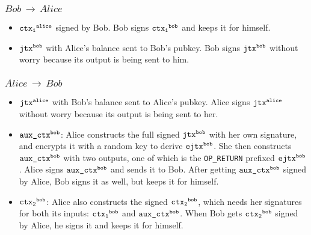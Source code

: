 \subsubsection{$Bob\,\to\,Alice$}
\begin{itemize}[leftmargin=4\parindent]
    \item $\texttt{ctx\textsubscript{1}\textsuperscript{alice}}$ signed by Bob. Bob signs $\texttt{ctx\textsubscript{1}\textsuperscript{bob}}$ and keeps it for himself.
    \item $\texttt{jtx\textsuperscript{bob}}$ with Alice's balance sent to Bob's pubkey. Bob signs $\texttt{jtx\textsuperscript{bob}}$ without worry because its output is being sent to him.
\end{itemize}
\subsubsection{$Alice\,\to\,Bob$}
\begin{itemize}[leftmargin=4\parindent]
    \item $\texttt{jtx\textsuperscript{alice}}$ with Bob's balance sent to Alice's pubkey. Alice signs $\texttt{jtx\textsuperscript{alice}}$ without worry because its output is being sent to her.
    \item $\texttt{aux\_ctx\textsuperscript{bob}}$: Alice constructs the full signed $\texttt{jtx\textsuperscript{bob}}$ with her own signature, and encrypts it with a random key to derive $\texttt{ejtx\textsuperscript{bob}}$. She then constructs $\texttt{aux\_ctx\textsuperscript{bob}}$ with two outputs, one of which is the \texttt{OP\_RETURN} prefixed $\texttt{ejtx\textsuperscript{bob}}$. Alice signs $\texttt{aux\_ctx\textsuperscript{bob}}$ and sends it to Bob. After getting $\texttt{aux\_ctx\textsuperscript{bob}}$ signed by Alice, Bob signs it as well, but keeps it for himself.
    \item $\texttt{ctx\textsubscript{2}\textsuperscript{bob}}$: Alice also constructs the signed $\texttt{ctx\textsubscript{2}\textsuperscript{bob}}$, which needs her signatures for both its inputs: $\texttt{ctx\textsubscript{1}\textsuperscript{bob}}$ and $\texttt{aux\_ctx\textsuperscript{bob}}$. When Bob gets $\texttt{ctx\textsubscript{2}\textsuperscript{bob}}$ signed by Alice, he signs it and keeps it for himself.
\end{itemize}
